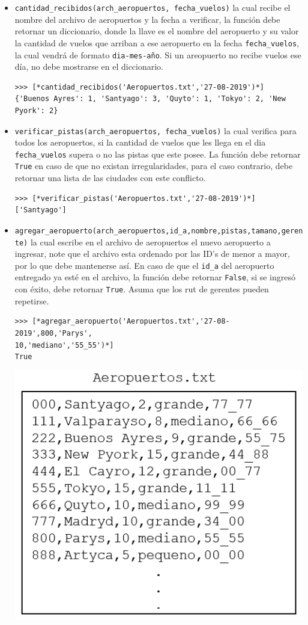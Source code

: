\begin{itemize}
    \item \texttt{cantidad\_recibidos(arch\_aeropuertos, fecha\_vuelos)} la cual recibe el nombre del archivo de aeropuertos y la fecha a verificar, la función debe retornar un diccionario, donde la llave es el nombre del aeropuerto y su valor la cantidad de vuelos que arriban a ese aeropuerto en la fecha \texttt{fecha\_vuelos}, la cual vendrá de formato \texttt{dia-mes-año}. Si un areopuerto no recibe vuelos ese día, no debe mostrarse en el diccionario.
\begin{lstlisting}[style=consola]
>>> [*cantidad_recibidos('Aeropuertos.txt','27-08-2019')*]
{'Buenos Ayres': 1, 'Santyago': 3, 'Quyto': 1, 'Tokyo': 2, 'New Pyork': 2}
\end{lstlisting}
    \item \texttt{verificar\_pistas(arch\_aeropuertos, fecha\_vuelos)} la cual verifica para todos los aeropuertos, si la cantidad de vuelos que les llega en el dia \texttt{fecha\_vuelos} supera o no las pistas que este posee. La función debe retornar \texttt{True} en caso de que no existan irregularidades, para el caso contrario, debe retornar una lista de las ciudades con este conflicto.
\begin{lstlisting}[style=consola]
>>> [*verificar_pistas('Aeropuertos.txt','27-08-2019')*]
['Santyago']
\end{lstlisting}
\item \texttt{agregar\_aeropuerto(arch\_aeropuertos,id\_a,nombre,pistas,tamano,gerente)} la cual escribe en el archivo de aeropuertos el nuevo aeropuerto a ingresar, note que el archivo esta ordenado por las ID's de menor a mayor, por lo que debe mantenerse así. En caso de que el \texttt{id\_a} del aeropuerto entregado ya esté en el archivo, la función debe retornar \texttt{False}, si se ingresó con éxito, debe retornar \texttt{True}. Asuma que los rut de gerentes pueden repetirse.
\begin{lstlisting}[style=consola]
>>> [*agregar_aeropuerto('Aeropuertos.txt','27-08-2019',800,'Parys',
10,'mediano','55_55')*]
True
\end{lstlisting}
\begin{center}
\includegraphics[scale=0.6]{Imagenes/nuevo.PNG}

\end{center}
\end{itemize}
